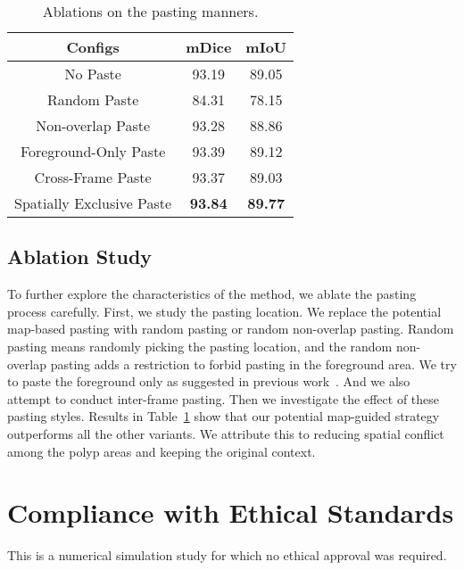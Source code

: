 \documentclass{article}
\begin{document}
\begin{table}[tbp]
\begin{center}
    \caption{Ablations on the pasting manners.}\label{tab:potentialmask}
\begin{tabular}{c|cc}
\hline
Configs &  mDice & mIoU \\ \hline
No Paste &93.19&89.05\\
Random Paste &84.31&78.15\\
Non-overlap Paste &93.28&88.86 \\
Foreground-Only Paste  &93.39&89.12\\
Cross-Frame Paste &93.37&89.03 \\
Spatially Exclusive Paste &\textbf{93.84}&\textbf{89.77}\\ \hline

\end{tabular}
\end{center}
\end{table}


\vspace{-0.2cm}
\subsection{Ablation Study}
To further explore the characteristics of the method, we ablate the pasting process carefully. First, we study the pasting location. We replace the potential map-based pasting with random pasting or random non-overlap pasting. Random pasting means randomly picking the pasting location, and the random non-overlap pasting adds a restriction to forbid pasting in the foreground area. We try to paste the foreground only as suggested in previous work~\cite{copypaste}. And we also attempt to conduct inter-frame pasting. Then we investigate the effect of these pasting styles. Results in Table~\ref{tab:potentialmask} show that our potential map-guided strategy outperforms all the other variants. We attribute this to reducing spatial conflict among the polyp areas and keeping the original context.






\vspace{-0.2cm}
\section{Compliance with Ethical Standards}
\vspace{-0.2cm}
This is a numerical simulation study for which no ethical approval was required.
\end{document}
